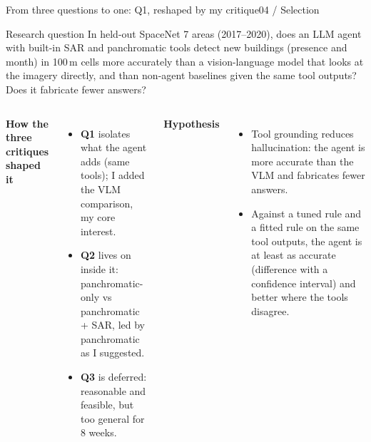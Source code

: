 \documentclass[aspectratio=169,11pt]{beamer}
\begin{document}
\begin{frame}[shrink=16]{From three questions to one: Q1, reshaped by my critique}{04 / Selection}
\begin{block}{Research question}\small
In held-out SpaceNet 7 areas (2017--2020), does an LLM agent with built-in SAR and panchromatic tools detect new buildings (presence and month) in 100\,m cells more accurately than \alert{a vision-language model that looks at the imagery directly}, and than \alert{non-agent baselines given the same tool outputs}? Does it fabricate fewer answers?
\end{block}
\begin{columns}[T,onlytextwidth]
\textbf{How the three critiques shaped it}
\begin{itemize}\footnotesize
  \item \textbf{Q1} isolates what the agent adds (same tools); I added the VLM comparison, my core interest.
  \item \textbf{Q2} lives on inside it: panchromatic-only vs panchromatic + SAR, led by panchromatic as I suggested.
  \item \textbf{Q3} is deferred: reasonable and feasible, but too general for 8 weeks.
\end{itemize}
\textbf{Hypothesis}
\begin{itemize}\footnotesize
  \item Tool grounding reduces hallucination: the agent is more accurate than the VLM and fabricates fewer answers.
  \item Against a tuned rule and a fitted rule on the same tool outputs, the agent is at least as accurate (difference with a confidence interval) and better where the tools disagree.
\end{itemize}
\end{columns}
\end{frame}
\end{document}
